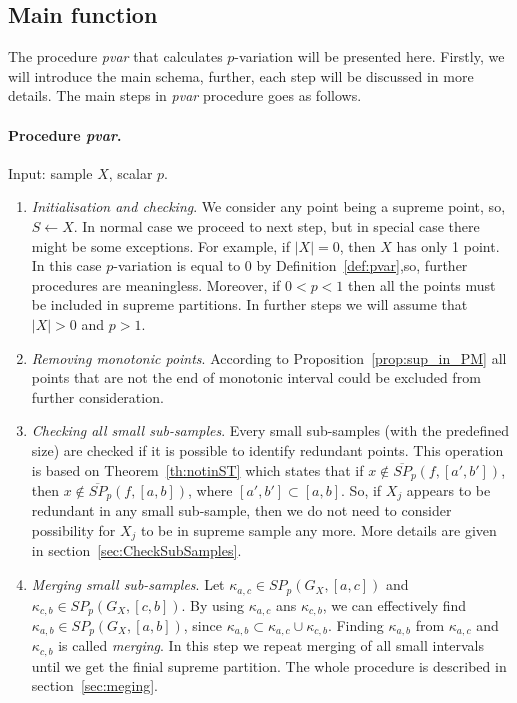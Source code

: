 \documentclass[12pt, a4paper]{article}
\numberwithin{equation}{section}
\begin{document}
\subsection{Main function}
\label{sub:MainFunction}

The procedure \emph{pvar} that calculates
$p$-variation will be presented here. Firstly,
we will introduce the main schema, further, each step will
be discussed in more details. 
The main steps in \emph{pvar} procedure
goes as follows.


\paragraph{Procedure \emph{pvar}.}
Input: sample $X$, scalar $p$.

\begin{enumerate}
  
  \item \emph{Initialisation and checking}. We 
  consider any point being a supreme point, 
  so, $S \leftarrow X$. 
  In normal case we proceed to next step, 
  but in special case there might
  be some exceptions. For example, 
  if $|X|=0$, then $X$ has only 1 point.
  In this case $p$-variation is equal to 0 by 
  Definition~\ref{def:pvar},so, 
  further procedures are meaningless.
  Moreover, if $0 < p < 1$ then all the points must
  be included in supreme partitions.
  In further steps we will assume
  that $|X|>0$ and $p>1$.
  
  \item \emph{Removing monotonic points}. According to 
  Proposition~\ref{prop:sup_in_PM}
  all points that are not the end of 
  monotonic interval could be excluded 
  from further consideration. 
  
  \item \emph{Checking all small sub-samples}. 
  Every small sub-samples (with the predefined size) 
  are checked if it is possible to 
  identify redundant points. 
  This operation is based on 
  Theorem~\ref{th:notinST} which states that 
  if $x \notin \overline{SP}_p(f, [a', b'])$, then 
  $x \notin \overline{SP}_p(f, [a, b])$, where 
  $[a', b'] \subset [a,b]$.
  So, if $X_j$ appears to be redundant in
  any small sub-sample, then
  we do not need to consider possibility for
  $X_j$ to be in supreme sample any more. 
  More details are given in
  section~\ref{sec:CheckSubSamples}.  
 
  \item \emph{Merging small sub-samples}.  
  Let $\kappa_{a,c} \in SP_p(G_X, [a,c])$ and
  $\kappa_{c,b} \in SP_p(G_X, [c, b])$. 
  By using $\kappa_{a,c}$
  ans $\kappa_{c,b}$, we can effectively
  find $\kappa_{a,b} \in SP_p(G_X, [a, b])$, since
  $\kappa_{a,b} \subset \kappa_{a,c} \cup \kappa_{c,b}$. 
  Finding
  $\kappa_{a,b}$ from $\kappa_{a,c}$ and $\kappa_{c,b}$ 
  is called \emph{merging}.
  In this step we repeat merging of all
  small intervals until
  we get the finial supreme partition.
  The whole procedure is described in
  section~\ref{sec:meging}.  
  

\end{enumerate}
\end{document}

